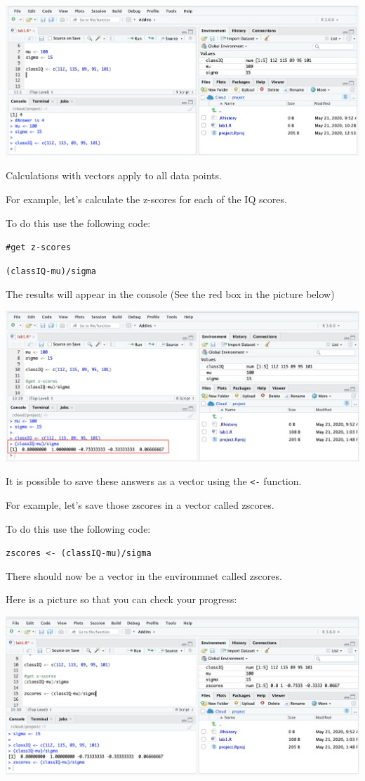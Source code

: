 \documentclass[
]{book}
\begin{document}
\includegraphics{img/vector.png}

Calculations with vectors apply to all data points.

For example, let's calculate the z-scores for each of the IQ scores.

To do this use the following code:

\texttt{\#get\ z-scores}

\texttt{(classIQ-mu)/sigma}

The results will appear in the console (See the red box in the picture below)

\includegraphics{img/zscores.png}

It is possible to save these answers as a vector using the \texttt{\textless{}-} function.

For example, let's save those zscores in a vector called zscores.

To do this use the following code:

\texttt{zscores\ \textless{}-\ (classIQ-mu)/sigma}

There should now be a vector in the environmnet called zscores.

Here is a picture so that you can check your progress:

\includegraphics{img/zsaved.png}
\end{document}
